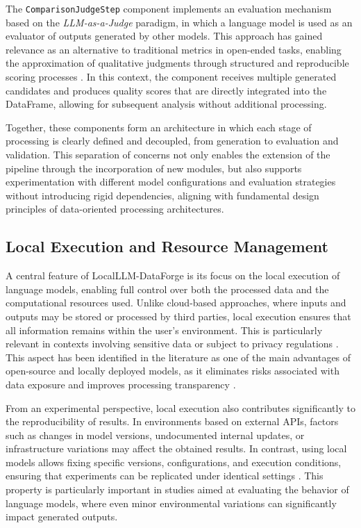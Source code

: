 \documentclass[pdflatex,sn-mathphys-num]{sn-jnl}
\theoremstyle{thmstyleone}%
\theoremstyle{thmstyletwo}%
\theoremstyle{thmstylethree}%
\begin{document}
The \texttt{ComparisonJudgeStep} component implements an evaluation mechanism based on the \textit{LLM-as-a-Judge} paradigm, in which a language model is used as an evaluator of outputs generated by other models. This approach has gained relevance as an alternative to traditional metrics in open-ended tasks, enabling the approximation of qualitative judgments through structured and reproducible scoring processes \cite{llm_judge_survey}. In this context, the component receives multiple generated candidates and produces quality scores that are directly integrated into the DataFrame, allowing for subsequent analysis without additional processing.

Together, these components form an architecture in which each stage of processing is clearly defined and decoupled, from generation to evaluation and validation. This separation of concerns not only enables the extension of the pipeline through the incorporation of new modules, but also supports experimentation with different model configurations and evaluation strategies without introducing rigid dependencies, aligning with fundamental design principles of data-oriented processing architectures.

\subsection{Local Execution and Resource Management}

A central feature of LocalLLM-DataForge is its focus on the local execution of language models, enabling full control over both the processed data and the computational resources used. Unlike cloud-based approaches, where inputs and outputs may be stored or processed by third parties, local execution ensures that all information remains within the user’s environment. This is particularly relevant in contexts involving sensitive data or subject to privacy regulations \cite{local_llm_privacy}. This aspect has been identified in the literature as one of the main advantages of open-source and locally deployed models, as it eliminates risks associated with data exposure and improves processing transparency \cite{local_llm_reproducibility}.

From an experimental perspective, local execution also contributes significantly to the reproducibility of results. In environments based on external APIs, factors such as changes in model versions, undocumented internal updates, or infrastructure variations may affect the obtained results. In contrast, using local models allows fixing specific versions, configurations, and execution conditions, ensuring that experiments can be replicated under identical settings \cite{local_llm_reproducibility}. This property is particularly important in studies aimed at evaluating the behavior of language models, where even minor environmental variations can significantly impact generated outputs.
\end{document}

